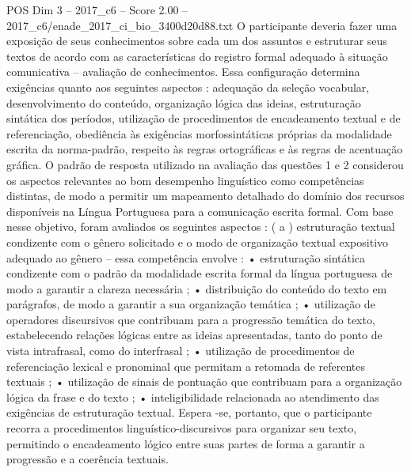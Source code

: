 \begin{textsample}{POS Dim 3 – 2017\_c6 – Score 2.00 – 2017\_c6/enade\_2017\_ci\_bio\_3400d20d88.txt}
O participante deveria fazer uma exposição de seus conhecimentos sobre cada um dos assuntos e estruturar seus textos de acordo com as características do registro formal adequado à situação comunicativa – avaliação de conhecimentos.
Essa configuração determina exigências quanto aos seguintes aspectos : adequação da seleção vocabular, desenvolvimento do conteúdo, organização lógica das ideias, estruturação sintática dos períodos, utilização de procedimentos de encadeamento textual e de referenciação, obediência às exigências morfossintáticas próprias da modalidade escrita da norma-padrão, respeito às regras ortográficas e às regras de acentuação gráfica.
O padrão de resposta utilizado na avaliação das questões 1 e 2 considerou os aspectos relevantes ao bom desempenho linguístico como competências distintas, de modo a permitir um mapeamento detalhado do domínio dos recursos disponíveis na Língua Portuguesa para a comunicação escrita formal.
Com base nesse objetivo, foram avaliados os seguintes aspectos : ( a ) estruturação textual condizente com o gênero solicitado e o modo de organização textual expositivo adequado ao gênero – essa competência envolve : • estruturação sintática condizente com o padrão da modalidade escrita formal da língua portuguesa de modo a garantir a clareza necessária ; • distribuição do conteúdo do texto em parágrafos, de modo a garantir a sua organização temática ; • utilização de operadores discursivos que contribuam para a progressão temática do texto, estabelecendo relações lógicas entre as ideias apresentadas, tanto do ponto de vista intrafrasal, como do interfrasal ; • utilização de procedimentos de referenciação lexical e pronominal que permitam a retomada de referentes textuais ; • utilização de sinais de pontuação que contribuam para a organização lógica da frase e do texto ; • inteligibilidade relacionada ao atendimento das exigências de estruturação textual.
Espera -se, portanto, que o participante recorra a procedimentos linguístico-discursivos para organizar seu texto, permitindo o encadeamento lógico entre suas partes de forma a garantir a progressão e a coerência textuais.

\end{textsample}
